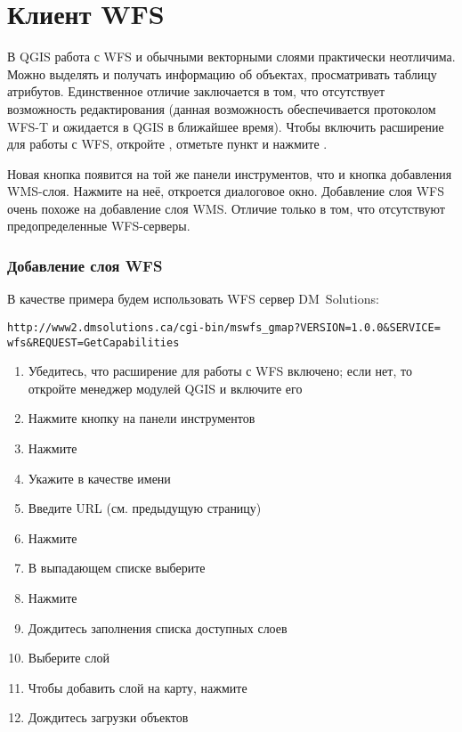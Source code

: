 %
%
\section{Клиент WFS}\label{sec:ogc-wfs}

В QGIS работа с WFS и обычными векторными слоями практически неотличима.
Можно выделять и получать информацию об объектах, просматривать таблицу
атрибутов. Единственное отличие заключается в том, что отсутствует возможность
редактирования (данная возможность обеспечивается протоколом WFS-T и ожидается
в QGIS в ближайшее время). Чтобы включить расширение для работы с WFS, откройте
 \arrow {}, отметьте пункт  и нажмите
.

Новая кнопка  появится на той
же панели инструментов, что и кнопка добавления WMS-слоя. Нажмите на неё,
откроется диалоговое окно. Добавление слоя WFS очень похоже на добавление слоя
WMS. Отличие только в том, что отсутствуют предопределенные WFS-серверы.

\subsubsection{Добавление слоя WFS}

В качестве примера будем использовать WFS сервер DM~Solutions:
\begin{verbatim}
http://www2.dmsolutions.ca/cgi-bin/mswfs_gmap?VERSION=1.0.0&SERVICE=
wfs&REQUEST=GetCapabilities
\end{verbatim}

\begin{enumerate}
  \item Убедитесь, что расширение для работы с WFS включено; если нет, то
  откройте менеджер модулей QGIS и включите его
  \item Нажмите кнопку
  на панели инструментов
  \item Нажмите 
  \item Укажите  в качестве имени
  \item Введите URL (см. предыдущую страницу)
  \item Нажмите 
  \item В выпадающем списке выберите 
  \item Нажмите 
  \item Дождитесь заполнения списка доступных слоев
  \item Выберите слой 
  \item Чтобы добавить слой на карту, нажмите 
  \item Дождитесь загрузки объектов
\end{enumerate}

